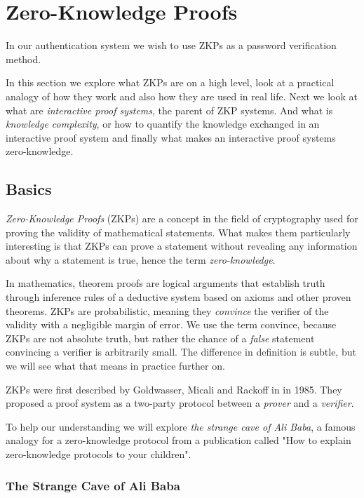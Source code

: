 \section{Zero-Knowledge Proofs}
In our authentication system we wish to use ZKPs as a password verification method.

In this section we explore what ZKPs are on a high level, look at a practical analogy of how they work and also how they are used in real life.
Next we look at what are \textit{interactive proof systems}, the parent of ZKP systems.
And what is \textit{knowledge complexity}, or how to quantify the knowledge exchanged in an interactive proof system and finally what makes an interactive proof systems zero-knowledge.

\subsection{Basics}
\textit{Zero-Knowledge Proofs} (ZKPs) are a concept in the field of cryptography used for proving the validity of mathematical statements.
What makes them particularly interesting is that ZKPs can prove a statement without revealing any information about why a statement is true, hence the term \textit{zero-knowledge}.

In mathematics, theorem proofs are logical arguments that establish truth through inference rules of a deductive system based on axioms and other proven theorems.
ZKPs are probabilistic, meaning they \textit{convince} the verifier of the validity with a negligible margin of error.
We use the term convince, because ZKPs are not absolute truth, but rather the chance of a \textit{false} statement convincing a verifier is arbitrarily small. 
The difference in definition is subtle, but we will see what that means in practice further on.

ZKPs were first described by Goldwasser, Micali and Rackoff in \cite{goldwasser1989knowledge} in 1985. 
They proposed a proof system as a two-party protocol between a \textit{prover} and a \textit{verifier}.

To help our understanding we will explore \cite{10.1007/0-387-34805-0_60} \textit{the strange cave of Ali Baba}, a famous analogy for a zero-knowledge protocol from a publication called "How to explain zero-knowledge protocols to your children".

\newpage
\subsubsection{The Strange Cave of Ali Baba}

